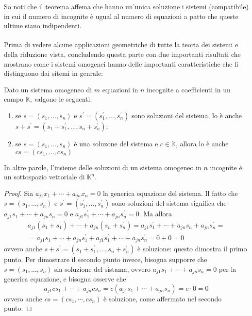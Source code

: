 \begin{oss}
  \label{oss:guess-jorda2}
  So noti che il teorema affema che hanno un'unica soluzione i sistemi
  (compatibile) in cui il numero di incognite è ugual al numero di
  equazioni a patto che queste ultime siano indipendenti.\\\\
  Prima di vedere alcune applicazioni geometriche di tutte la teoria
  dei sistemi e della riduzione vista, concludendo questa parte con due
  importanti risultati che mostrano come i sistemi omogenei hanno delle
  importanti caratteristiche che li distinguono dai sitemi in genrale:
\end{oss}
\begin{prop}
  \label{prop:gauss-jorda3}
  Dato un sistema omogeneo di $m$ equazioni in $n$ incognite a
  coefficienti in un campo $\mathds{K}$, valgono le seguenti:
  \begin{enumerate}
  \item se $s=(s_1,\dots,s_n)$ e $s^\prime=(s_1^\prime,\dots,s_n^\prime)$
    sono soluzioni del sistema, lo è anche $s+s^\prime=(s_1+s_1^\prime,
    \dots,s_n+s_n^\prime)$;
  \item se $s=(s_1,\dots,s_n)$ è una soluzone del sistema e $c\in
    \mathds{K}$, allora lo è anche $cs=(cs_1,\dots,cs_n)$
  \end{enumerate}
  In altre parole, l'insieme delle soluzioni di un sistema omogeneo in
  $n$ incognite è un sottospazio vettoriale di $\mathds{K}^n$.
\end{prop}
\begin{proof}
  Sia $a_{j1}x_1+\cdots+a_{jn}x_n=0$ la generica equazione del sistema. Il
  fatto che $s=(s_1,\dots,s_n)$ e $s^\prime=(s_1^\prime,\dots,s_n^\prime)$
  sono soluzioni del sistema significa che $a_{j1}s_1+\cdots+a_{jn}s_n=0$
  e $a_{j1}s_{1}^\prime+\cdots+a_{jn}s_n^\prime=0$. Ma allora
  \begin{equation}
    \label{eq:gauss-jorda3-1}
    \begin{matrix}
      a_{j1} (s_1+s^\prime_1) +\cdots+a_{jn}(s_n+s_n^\prime)=a_{j1}s_1^\prime+
      \cdots+a_{jn} s_n+a_{jn}s_n^\prime=\\
      =a_{j1}s_1+\cdots+a_{jn}s_1^\prime+a_{j1}s_1^\prime+\cdots+a_{jn}s_n^\prime=0+0=0
    \end{matrix}
  \end{equation}
  ovvero anche $s+s^\prime=(s_1+s_1^\prime,\dots,s_n+s_n^\prime)$ è
  soluzione: questo dimostra il primo punto.
  Per dimostrare il secondo punto invece, bisogna supporre che
  $s=(s_1,\dots,s_n)$ sia soluzione del sistama, ovvero
  $a_{j1}s_1+\cdots+a_{jn}s_n=0$ per la generica equazione, e bisogna
  osserve che
  \begin{equation}
    \label{eq:gauss-jorda3-2}
    a_{j1}cs_1+\cdots+a_{jn}cs_n=c(a_{j1}s_1+\cdots+a_{jn}s_n)=c\cdot0=0
  \end{equation}
  ovvero anche $cs=(cs_1,\cdots,cs_n)$ è soluzione, come affermato
  nel secondo punto.
\end{proof}
